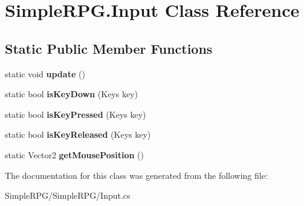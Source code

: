 \hypertarget{class_simple_r_p_g_1_1_input}{\section{Simple\-R\-P\-G.\-Input Class Reference}
\label{class_simple_r_p_g_1_1_input}
}
\subsection*{Static Public Member Functions}
\begin{DoxyCompactItemize}
\item 
\hypertarget{class_simple_r_p_g_1_1_input_a5030a4e61c1ca8fc490575e968339126}{static void {\bfseries update} ()}\label{class_simple_r_p_g_1_1_input_a5030a4e61c1ca8fc490575e968339126}

\item 
\hypertarget{class_simple_r_p_g_1_1_input_a187b5eab7cd9b9f198adb08d7a507b3c}{static bool {\bfseries is\-Key\-Down} (Keys key)}\label{class_simple_r_p_g_1_1_input_a187b5eab7cd9b9f198adb08d7a507b3c}

\item 
\hypertarget{class_simple_r_p_g_1_1_input_ab67cea9332b183fb664d9bf497ad61c6}{static bool {\bfseries is\-Key\-Pressed} (Keys key)}\label{class_simple_r_p_g_1_1_input_ab67cea9332b183fb664d9bf497ad61c6}

\item 
\hypertarget{class_simple_r_p_g_1_1_input_aa2424d5308db570017de73a616ad48eb}{static bool {\bfseries is\-Key\-Released} (Keys key)}\label{class_simple_r_p_g_1_1_input_aa2424d5308db570017de73a616ad48eb}

\item 
\hypertarget{class_simple_r_p_g_1_1_input_a70cff65ec2b3d91956952a1986fa22d6}{static Vector2 {\bfseries get\-Mouse\-Position} ()}\label{class_simple_r_p_g_1_1_input_a70cff65ec2b3d91956952a1986fa22d6}

\end{DoxyCompactItemize}


The documentation for this class was generated from the following file\-:\begin{DoxyCompactItemize}
\item 
Simple\-R\-P\-G/\-Simple\-R\-P\-G/Input.\-cs\end{DoxyCompactItemize}
